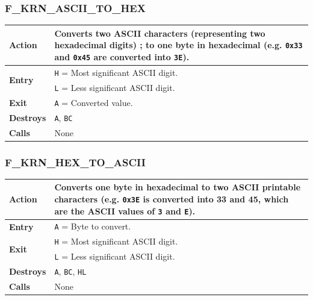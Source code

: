 \documentclass[a4paper,11pt]{article}
\begin{document}
        \subsubsection{F\_KRN\_ASCII\_TO\_HEX}
        \label{func:fkrnasciitohex}
        \begin{tabular}{l p{9cm}}
            \hline\textbf{Action}
            & Converts two ASCII characters (representing two hexadecimal digits)
            ; to one byte in hexadecimal (e.g. \texttt{0x33} and \texttt{0x45}
            are converted into \texttt{3E}).\\
            \hline\multirow[t]{2}{4em}{\textbf{Entry}}
            & \texttt{H} = Most significant ASCII digit.\\
            & \texttt{L} = Less significant ASCII digit.\\
            \hline\textbf{Exit} & \texttt{A} = Converted value.\\
            \hline\textbf{Destroys} & \texttt{A}, \texttt{BC}\\
            \hline\textbf{Calls} & None\\
            \hline
        \end{tabular}

        \subsubsection{F\_KRN\_HEX\_TO\_ASCII}
        \label{func:fkrnhextoascii}
        \begin{tabular}{l p{9cm}}
            \hline\textbf{Action}
            & Converts one byte in hexadecimal to two ASCII printable characters
            (e.g. \texttt{0x3E} is converted into 33 and 45, which are the ASCII
            values of \texttt{3} and \texttt{E}).\\
            \hline\textbf{Entry} & \texttt{A} = Byte to convert.\\
            \hline\multirow[t]{2}{4em}{\textbf{Exit}}
            & \texttt{H} = Most significant ASCII digit.\\
            & \texttt{L} = Less significant ASCII digit.\\
            \hline\textbf{Destroys} & \texttt{A}, \texttt{BC}, \texttt{HL}\\
            \hline\textbf{Calls} & None\\
            \hline
        \end{tabular}
\end{document}
